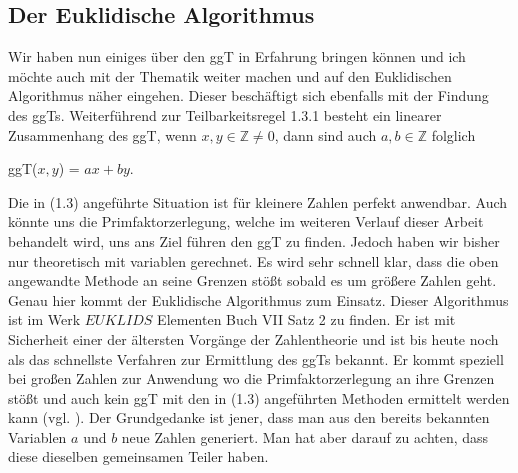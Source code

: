 \documentclass[german,12pt,a4paper]{article}
\begin{document}
\subsection{Der Euklidische Algorithmus}
Wir haben nun einiges über den ggT in Erfahrung bringen können und ich möchte auch mit der Thematik weiter machen und auf den Euklidischen Algorithmus näher eingehen. Dieser beschäftigt sich ebenfalls mit der Findung des ggTs.\newline
Weiterführend zur Teilbarkeitsregel 1.3.1 besteht ein linearer Zusammenhang des ggT, wenn $x, y \in \mathbb{Z} \neq 0$, dann sind auch $a, b \in \mathbb{Z}$ folglich
\begin{center}
ggT($x, y$) = $ax + by$.
\end{center}
Die in (1.3) angeführte Situation ist für kleinere Zahlen perfekt anwendbar. Auch könnte uns die Primfaktorzerlegung, welche im weiteren Verlauf dieser Arbeit behandelt wird, uns ans Ziel führen den ggT zu finden. Jedoch haben wir bisher nur theoretisch mit variablen gerechnet. Es wird sehr schnell klar, dass die oben angewandte Methode an seine Grenzen stößt sobald es um größere Zahlen geht. Genau hier kommt der Euklidische Algorithmus zum Einsatz. Dieser Algorithmus ist im Werk $EUKLIDS$ Elementen Buch VII Satz 2 zu finden. Er ist mit Sicherheit einer der ältersten Vorgänge der Zahlentheorie und ist bis heute noch als das schnellste Verfahren zur Ermittlung des ggTs bekannt. Er kommt speziell bei großen Zahlen zur Anwendung wo die Primfaktorzerlegung an ihre Grenzen stößt und auch kein ggT mit den in (1.3) angeführten Methoden ermittelt werden kann (vgl. \cite[83--84]{Crandall2005}).\newline
Der Grundgedanke ist jener, dass man aus den bereits bekannten Variablen $a$ und $b$ neue Zahlen generiert. Man hat aber darauf zu achten, dass diese dieselben gemeinsamen Teiler haben.
\end{document}
